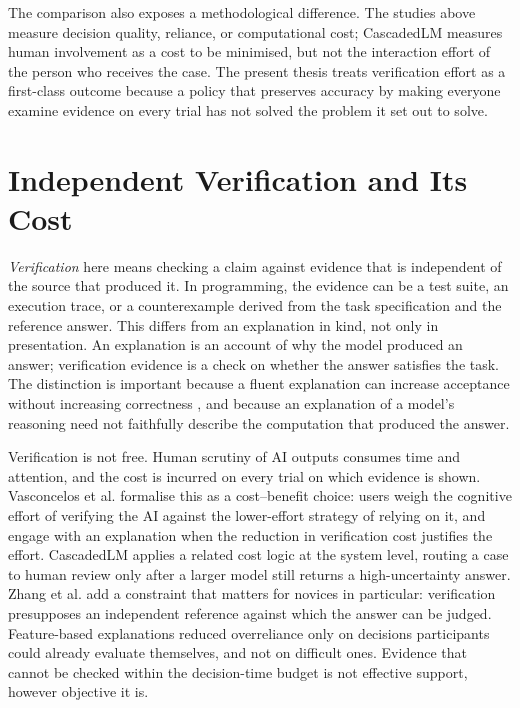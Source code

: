 \documentclass[oneside,final,14pt,a4paper]{extreport}
\begin{document}
The comparison also exposes a methodological difference. The studies above
measure decision quality, reliance, or computational cost; CascadedLM measures
human involvement as a cost to be minimised, but not the interaction effort of
the person who receives the case. The present thesis treats verification effort
as a first-class outcome because a policy that preserves accuracy by making
everyone examine evidence on every trial has not solved the problem it set out
to solve.

\section{Independent Verification and Its Cost}
\label{sec:lit-verification}

\emph{Verification} here means checking a claim against evidence that is
independent of the source that produced it. In programming, the evidence can be
a test suite, an execution trace, or a counterexample derived from the task
specification and the reference answer. This differs from an explanation in
kind, not only in presentation. An explanation is an account of why the model
produced an answer; verification evidence is a check on whether the answer
satisfies the task. The distinction is important because a fluent explanation
can increase acceptance without increasing correctness \cite{Bansal2021}, and
because an explanation of a model's reasoning need not faithfully describe the
computation that produced the answer.

Verification is not free. Human scrutiny of AI outputs consumes time and
attention, and the cost is incurred on every trial on which evidence is shown.
Vasconcelos et al. \cite{Vasconcelos2022} formalise this as a cost--benefit
choice: users weigh the cognitive effort of verifying the AI against the
lower-effort strategy of relying on it, and engage with an explanation when the
reduction in verification cost justifies the effort. CascadedLM
\cite{CascadedLM2025} applies a related cost logic at the system level, routing a
case to human review only after a larger model still returns a high-uncertainty
answer. Zhang et al. \cite{Zhang2024Verify} add a constraint that matters for
novices in particular: verification presupposes an independent reference against
which the answer can be judged. Feature-based explanations reduced overreliance
only on decisions participants could already evaluate themselves, and not on
difficult ones. Evidence that cannot be checked within the decision-time budget
is not effective support, however objective it is.
\end{document}
